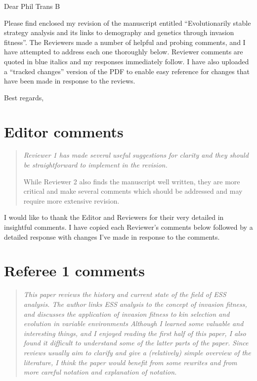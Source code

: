 \documentclass[10pt,parskip=full,foldmarks=off,addrfield=off,backaddress=false,refline=dateleft,letterpaper]{scrlttr2}
\newenvironment{reviewerquote}{\begin{quote}\color{DarkBlue}\itshape}{\end{quote}}
\begin{document}
\begin{letter}

  \opening{Dear Phil Trans B}

  Please find enclosed my revision of the manuscript entitled ``Evolutionarily stable strategy analysis and its links to demography and genetics through invasion fitness''. The Reviewers made a number of helpful and probing comments, and I have attempted to address each one thoroughly below. Reviewer comments are quoted in blue italics and my responses immediately follow. I have also uploaded a ``tracked changes'' version of the PDF to enable easy reference for changes that have been made in response to the reviews.

  \closing{Best regards,}

\section{Editor comments}

\begin{reviewerquote}
  Reviewer 1 has made several useful suggestions for clarity and they should be straightforward to implement in the revision.

  While Reviewer 2 also finds the manuscript well written, they are more critical and make several comments which should be addressed and may require more extensive revision.
\end{reviewerquote}

I would like to thank the Editor and Reviewers for their very detailed in insightful comments. I have copied each Reviewer's comments below followed by a detailed response with changes I've made in response to the comments.

\section{Referee 1 comments}

\begin{reviewerquote}
  This paper reviews the history and current state of the field of ESS analysis. The author links ESS analysis to the concept of invasion fitness, and discusses the application of invasion fitness to kin selection and evolution in variable environments Although I learned some valuable and interesting things, and I enjoyed reading the first half of this paper, I also found it difficult to understand some of the latter parts of the paper. Since reviews usually aim to clarify and give a (relatively) simple overview of the literature, I think the paper would benefit from some rewrites and from more careful notation and explanation of notation.
\end{reviewerquote}


\end{letter}
\end{document}
